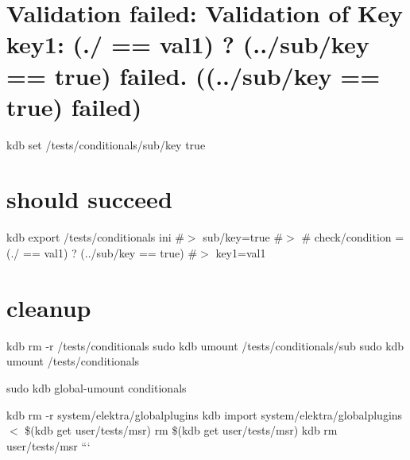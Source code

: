 \section*{Validation failed\+: Validation of Key key1\+: (./ == \textquotesingle{}val1\textquotesingle{}) ? (../sub/key == \textquotesingle{}true\textquotesingle{}) failed. ((../sub/key == \textquotesingle{}true\textquotesingle{}) failed)}

kdb set /tests/conditionals/sub/key true

\section*{should succeed}

kdb export /tests/conditionals ini \#$>$ sub/key=true \#$>$ \# check/condition = (./ == \textquotesingle{}val1\textquotesingle{}) ? (../sub/key == \textquotesingle{}true\textquotesingle{}) \#$>$ key1=val1

\section*{cleanup}

kdb rm -\/r /tests/conditionals sudo kdb umount /tests/conditionals/sub sudo kdb umount /tests/conditionals

sudo kdb global-\/umount conditionals

kdb rm -\/r system/elektra/globalplugins kdb import system/elektra/globalplugins $<$ \$(kdb get user/tests/msr) rm \$(kdb get user/tests/msr) kdb rm user/tests/msr ``` 